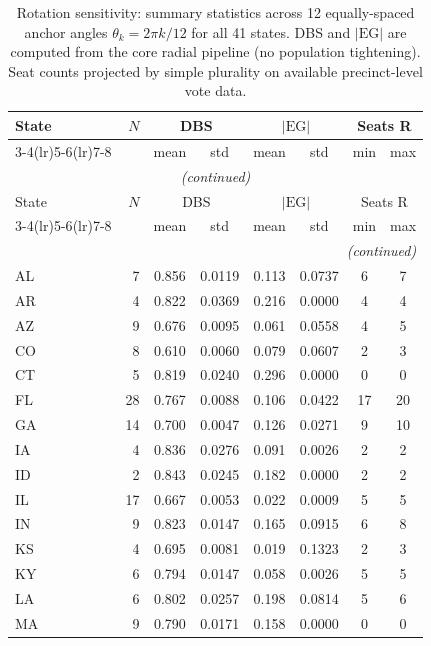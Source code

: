 \begin{longtable}{l r cccc cc}
\caption{Rotation sensitivity: summary statistics across 12 equally-spaced
anchor angles $\theta_k = 2\pi k/12$ for all 41 states. DBS and $|\mathrm{EG}|$
are computed from the core radial pipeline (no population tightening).
Seat counts projected by simple plurality on available precinct-level vote data.}
\label{tab:rotation-sensitivity}\\
\toprule
State & $N$ & \multicolumn{2}{c}{DBS} & \multicolumn{2}{c}{$|\mathrm{EG}|$} & \multicolumn{2}{c}{Seats R} \\
\cmidrule(lr){3-4}\cmidrule(lr){5-6}\cmidrule(lr){7-8}
& & mean & std & mean & std & min & max \\
\midrule
\endfirsthead
\multicolumn{8}{c}{\small\textit{(continued)}}\\
\toprule
State & $N$ & \multicolumn{2}{c}{DBS} & \multicolumn{2}{c}{$|\mathrm{EG}|$} & \multicolumn{2}{c}{Seats R} \\
\cmidrule(lr){3-4}\cmidrule(lr){5-6}\cmidrule(lr){7-8}
& & mean & std & mean & std & min & max \\
\midrule
\endhead
\midrule\multicolumn{8}{r}{\small\textit{(continued)}}\\\endfoot
\bottomrule\endlastfoot
AL & 7 & 0.856 & 0.0119 & 0.113 & 0.0737 & 6 & 7 \\
AR & 4 & 0.822 & 0.0369 & 0.216 & 0.0000 & 4 & 4 \\
AZ & 9 & 0.676 & 0.0095 & 0.061 & 0.0558 & 4 & 5 \\
CO & 8 & 0.610 & 0.0060 & 0.079 & 0.0607 & 2 & 3 \\
CT & 5 & 0.819 & 0.0240 & 0.296 & 0.0000 & 0 & 0 \\
FL & 28 & 0.767 & 0.0088 & 0.106 & 0.0422 & 17 & 20 \\
GA & 14 & 0.700 & 0.0047 & 0.126 & 0.0271 & 9 & 10 \\
IA & 4 & 0.836 & 0.0276 & 0.091 & 0.0026 & 2 & 2 \\
ID & 2 & 0.843 & 0.0245 & 0.182 & 0.0000 & 2 & 2 \\
IL & 17 & 0.667 & 0.0053 & 0.022 & 0.0009 & 5 & 5 \\
IN & 9 & 0.823 & 0.0147 & 0.165 & 0.0915 & 6 & 8 \\
KS & 4 & 0.695 & 0.0081 & 0.019 & 0.1323 & 2 & 3 \\
KY & 6 & 0.794 & 0.0147 & 0.058 & 0.0026 & 5 & 5 \\
LA & 6 & 0.802 & 0.0257 & 0.198 & 0.0814 & 5 & 6 \\
MA & 9 & 0.790 & 0.0171 & 0.158 & 0.0000 & 0 & 0 \\

\end{longtable}
